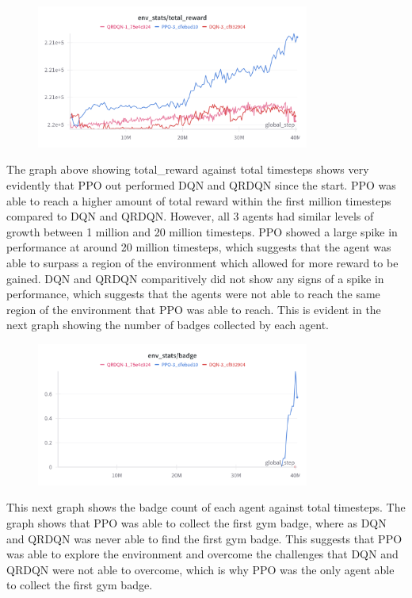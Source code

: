\begin{figure}[H]
    \centering
    \includegraphics[width=0.8\textwidth]{figures/all_step_total_reward.png}
    \caption{}
    \label{fig:agent_eval_all_reward}
\end{figure}

The graph above showing total\_reward against total timesteps shows very evidently that PPO out performed DQN and QRDQN since the start. PPO was able to reach a higher amount of total reward within the first million timesteps compared to DQN and QRDQN. However, all 3 agents had similar levels of growth between 1 million and 20 million timesteps. PPO showed a large spike in performance at around 20 million timesteps, which suggests that the agent was able to surpass a region of the environment which allowed for more reward to be gained. DQN and QRDQN comparitively did not show any signs of a spike in performance, which suggests that the agents were not able to reach the same region of the environment that PPO was able to reach. This is evident in the next graph showing the number of badges collected by each agent.

\begin{figure}[H]
    \centering
    \includegraphics[width=0.8\textwidth]{figures/all_step_badge.png}
    \caption{}
    \label{fig:agent_eval_all_badge}
\end{figure}

This next graph shows the badge count of each agent against total timesteps. The graph shows that PPO was able to collect the first gym badge, where as DQN and QRDQN was never able to find the first gym badge. This suggests that PPO was able to explore the environment and overcome the challenges that DQN and QRDQN were not able to overcome, which is why PPO was the only agent able to collect the first gym badge. 

